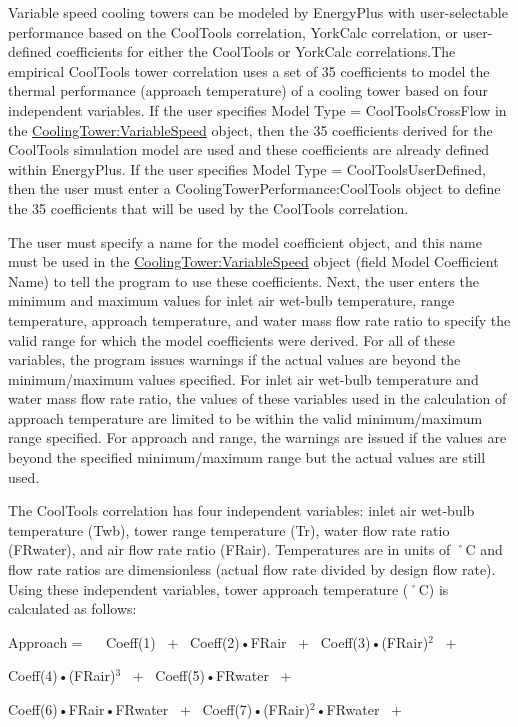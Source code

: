 Variable speed cooling towers can be modeled by EnergyPlus with user-selectable performance based on the CoolTools correlation, YorkCalc correlation, or user-defined coefficients for either the CoolTools or YorkCalc correlations.The empirical CoolTools tower correlation uses a set of 35 coefficients to model the thermal performance (approach temperature) of a cooling tower based on four independent variables. If the user specifies Model Type = CoolToolsCrossFlow in the \hyperref[coolingtowervariablespeed]{CoolingTower:VariableSpeed} object, then the 35 coefficients derived for the CoolTools simulation model are used and these coefficients are already defined within EnergyPlus. If the user specifies Model Type = CoolToolsUserDefined, then the user must enter a CoolingTowerPerformance:CoolTools object to define the 35 coefficients that will be used by the CoolTools correlation.

The user must specify a name for the model coefficient object, and this name must be used in the \hyperref[coolingtowervariablespeed]{CoolingTower:VariableSpeed} object (field Model Coefficient Name) to tell the program to use these coefficients. Next, the user enters the minimum and maximum values for inlet air wet-bulb temperature, range temperature, approach temperature, and water mass flow rate ratio to specify the valid range for which the model coefficients were derived. For all of these variables, the program issues warnings if the actual values are beyond the minimum/maximum values specified. For inlet air wet-bulb temperature and water mass flow rate ratio, the values of these variables used in the calculation of approach temperature are limited to be within the valid minimum/maximum range specified. For approach and range, the warnings are issued if the values are beyond the specified minimum/maximum range but the actual values are still used.

The CoolTools correlation has four independent variables: inlet air wet-bulb temperature (Twb), tower range temperature (Tr), water flow rate ratio (FRwater), and air flow rate ratio (FRair). Temperatures are in units of ˚C and flow rate ratios are dimensionless (actual flow rate divided by design flow rate). Using these independent variables, tower approach temperature (˚C) is calculated as follows:

Approach = ~~ Coeff(1)~ +~ Coeff(2)•FRair~ +~ Coeff(3)•(FRair)\(^{2}\)~ +

Coeff(4)•(FRair)\(^{3}\)~ +~ Coeff(5)•FRwater~ +

Coeff(6)•FRair•FRwater~ +~ Coeff(7)•(FRair)\(^{2}\)•FRwater~ +


